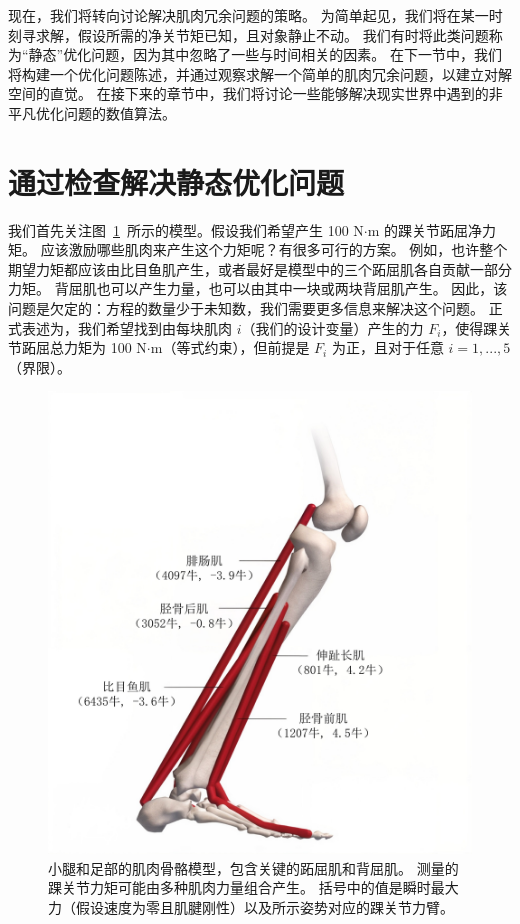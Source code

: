 现在，我们将转向讨论解决肌肉冗余问题的策略。
为简单起见，我们将在某一时刻寻求解，假设所需的净关节矩已知，且对象静止不动。
我们有时将此类问题称为“静态”优化问题，因为其中忽略了一些与时间相关的因素。
在下一节中，我们将构建一个优化问题陈述，并通过观察求解一个简单的肌肉冗余问题，以建立对解空间的直觉。
在接下来的章节中，我们将讨论一些能够解决现实世界中遇到的非平凡优化问题的数值算法。



\section{通过检查解决静态优化问题}

我们首先关注图~\ref{fig:9_2}~所示的模型。假设我们希望产生 100 N$ \cdot $m 的踝关节跖屈净力矩。
应该激励哪些肌肉来产生这个力矩呢？有很多可行的方案。
例如，也许整个期望力矩都应该由比目鱼肌产生，或者最好是模型中的三个跖屈肌各自贡献一部分力矩。
背屈肌也可以产生力量，也可以由其中一块或两块背屈肌产生。
因此，该问题是欠定的：方程的数量少于未知数，我们需要更多信息来解决这个问题。
正式表述为，我们希望找到由每块肌肉 $ i $（我们的设计变量）产生的力 $ F_i $，使得踝关节跖屈总力矩为 100 N$ \cdot $m（等式约束），但前提是 $ F_i $ 为正，且对于任意 $ i = 1, ..., 5 $（界限）。


\begin{figure}[!htb]
	\centering
	\includegraphics[width=0.7\linewidth]{chap9/9_2}
	\caption{小腿和足部的肌肉骨骼模型，包含关键的跖屈肌和背屈肌。
		测量的踝关节力矩可能由多种肌肉力量组合产生。
		括号中的值是瞬时最大力（假设速度为零且肌腱刚性）以及所示姿势对应的踝关节力臂。 \label{fig:9_2}}
\end{figure}


